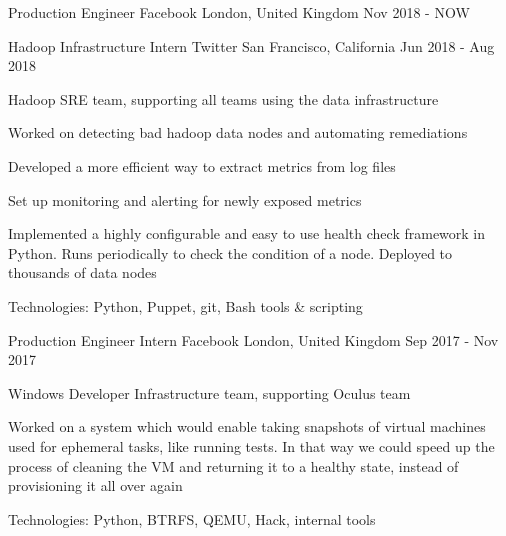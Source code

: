 
\begin{cventries}

  \cventry
    {Production Engineer} %
    {Facebook} %
    {London, United Kingdom} %
    {Nov 2018 - NOW} %
    {
    }

  \cventry
    {Hadoop Infrastructure Intern} %
    {Twitter} %
    {San Francisco, California} %
    {Jun 2018 - Aug 2018} %
    {
      \begin{cvitems} %
        \item {Hadoop SRE team, supporting all teams using the data infrastructure}
        \item {Worked on detecting bad hadoop data nodes and automating remediations}
        \item {Developed a more efficient way to extract metrics from log files}
        \item {Set up monitoring and alerting for newly exposed metrics}
        \item {Implemented a highly configurable and easy to use health check framework in Python. Runs periodically to check the condition of a node. Deployed to thousands of data nodes}
        \item {Technologies: Python, Puppet, git, Bash tools \& scripting}
      \end{cvitems}
    }

  \cventry
    {Production Engineer Intern} %
    {Facebook} %
    {London, United Kingdom} %
    {Sep 2017 - Nov 2017} %
    {
      \begin{cvitems} %
        \item {Windows Developer Infrastructure team, supporting Oculus team}
        \item {Worked on a system which would enable taking snapshots of virtual machines used for ephemeral tasks, like running tests. In that way we could speed up the process of cleaning the VM and returning it to a healthy state, instead of provisioning it all over again}
        \item {Technologies: Python, BTRFS, QEMU, Hack, internal tools}
      \end{cvitems}
    }


\end{cventries}

